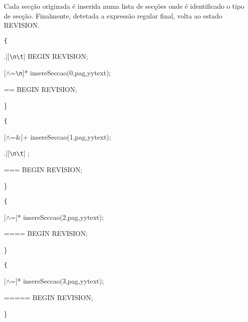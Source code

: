 \documentclass[12pt,letterpaper]{article}
\newcommand*{\escape}[1]{\texttt{\textbackslash#1}}
\begin{document}
\par Cada secção originada é inserida numa lista de secções onde é identificado o tipo de secção.
Finalmente, detetada a expressão regular final, volta ao estado REVISION.\\


{\tt <SECTION1>\{ \par
\hspace{1cm}	.|[\escape{n}\escape{t}]	\hspace{0.5cm}	BEGIN REVISION; \par
\hspace{1cm}	[$ \wedge $=\escape{n}]*	\hspace{0.5cm}		insereSeccao(0,pag,yytext); \par
\hspace{1cm}	== 	\hspace{1.55cm}		BEGIN REVISION;   \par
\}\\} 

{\tt<SECTION2>\{ \par
\hspace{1cm}	[$ \wedge $=\&]+		\hspace{0.8cm}	insereSeccao(1,pag,yytext); \par
\hspace{1cm}	.|[\escape{n}\escape{t}]	\hspace{0.5cm}	; \par
\hspace{1cm}	=== 	\hspace{1.5cm}		BEGIN REVISION; \par
\}\\}

{\tt<SECTION3>\{ \par
\hspace{1cm}	[$ \wedge $=]*		\hspace{0.5cm}	insereSeccao(2,pag,yytext); \par
\hspace{1cm}	==== 	\hspace{0.8cm}	BEGIN REVISION; \par
\}\\}

{\tt<SECTION4>\{ \par
\hspace{1cm}	[$ \wedge $=]*	\hspace{0.5cm}		insereSeccao(3,pag,yytext); \par
\hspace{1cm}	===== 	\hspace{0.5cm}	BEGIN REVISION; \par
\}\\}
\end{document}

